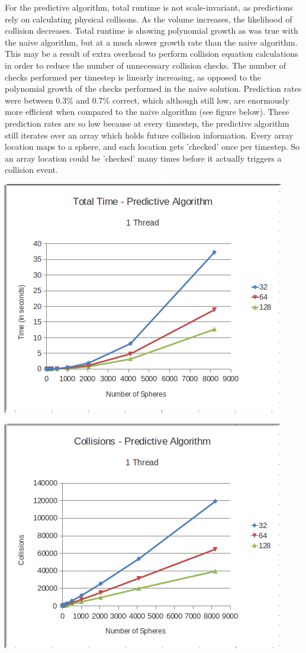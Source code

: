 \documentclass[conference]{IEEEtran}
\begin{document}
For the predictive algorithm, total runtime is not scale-invariant, as predictions rely on calculating physical collisons.  As the volume increases, the likelihood of collision decreases.  Total runtime is showing polynomial growth as was true with the naive algorithm, but at a much slower growth rate than the naive algorithm.  This may be a result of extra overhead to perform collision equation calculations in order to reduce the number of unnecessary collision checks.  The number of checks performed per timestep is linearly increasing, as opposed to the polynomial growth of the checks performed in the naive solution.  Prediction rates were between 0.3\% and 0.7\% correct, which although still low, are enormously more efficient when compared to the naive algorithm (see figure below).  These prediction rates are so low because at every timestep, the predictive algorithm still iterates over an array which holds future collision information.  Every array location maps to a sphere, and each location gets 'checked' once per timestep.  So an array location could be 'checked' many times before it actually triggers a collision event.

\begin{center}
	\includegraphics[width=.45\textwidth]{runtime_predictive_1thread.png}
\end{center}

\begin{center}
	\includegraphics[width=.45\textwidth]{collisions_predictive_1thread.png}
\end{center}
\end{document}
